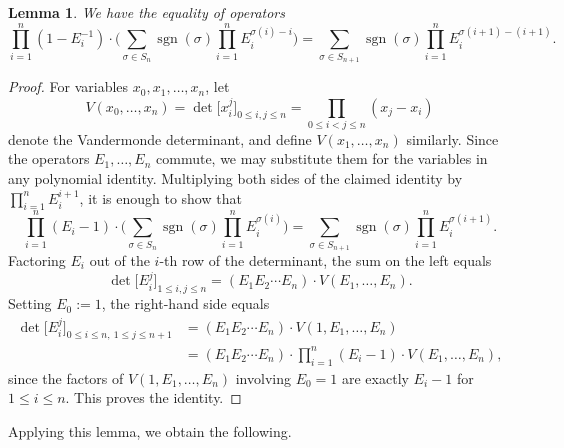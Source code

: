 \documentclass[reqno]{amsart}
\theoremstyle{plain}
\newtheorem{lemma}[theorem]{Lemma}
\theoremstyle{definition}
\theoremstyle{remark}
\theoremstyle{plain}
\DeclareMathOperator{\sgn}{sgn}
\begin{document}
\begin{lemma}\label{determinantal-identity}
We have the equality of operators
\begin{equation*}
    \prod_{i=1}^n(1-E_i^{-1})\cdot\Big(\sum_{\sigma\in S_n}\sgn(\sigma)\prod_{i=1}^nE_i^{\sigma(i)-i}\Big)=\sum_{\sigma\in S_{n+1}}\sgn(\sigma)\prod_{i=1}^nE_i^{\sigma(i+1)-(i+1)}.
\end{equation*}
\end{lemma}
\begin{proof}
For variables $x_0,x_1,\dots,x_n$, let
$$V(x_0,\dots,x_n)=\det\big[x_i^{j}\big]_{0\le i,j\le n}=\prod_{0\le i<j\le n}(x_j-x_i)$$
denote the Vandermonde determinant, and define $V(x_1,\dots,x_n)$ similarly.
Since the operators $E_1,\dots,E_n$ commute, we may substitute them for the
variables in any polynomial identity. Multiplying both sides of the claimed
identity by $\prod_{i=1}^nE_i^{i+1}$, it is enough to show that
$$\prod_{i=1}^n(E_i-1)\cdot\Big(\sum_{\sigma\in S_n}\sgn(\sigma)\prod_{i=1}^nE_i^{\sigma(i)}\Big)=\sum_{\sigma\in S_{n+1}}\sgn(\sigma)\prod_{i=1}^nE_i^{\sigma(i+1)}.$$
Factoring $E_i$ out of the $i$-th row of the determinant, the sum on the left
equals
$$\det\big[E_i^j\big]_{1\le i,j\le n}=(E_1E_2\cdots E_n)\cdot V(E_1,\dots,E_n).$$
Setting $E_0:=1$, the right-hand side equals
\begin{align*}
\det\big[E_i^{j}\big]_{0\le i\le n,\ 1\le j\le n+1}
&=(E_1E_2\cdots E_n)\cdot V(1,E_1,\dots,E_n)\\
&=(E_1E_2\cdots E_n)\cdot\prod_{i=1}^n(E_i-1)\cdot V(E_1,\dots,E_n),
\end{align*}
since the factors of $V(1,E_1,\dots,E_n)$ involving $E_0=1$ are exactly
$E_i-1$ for $1\le i\le n$. This proves the identity.
\end{proof}

Applying this lemma, we obtain the following.
\end{document}
